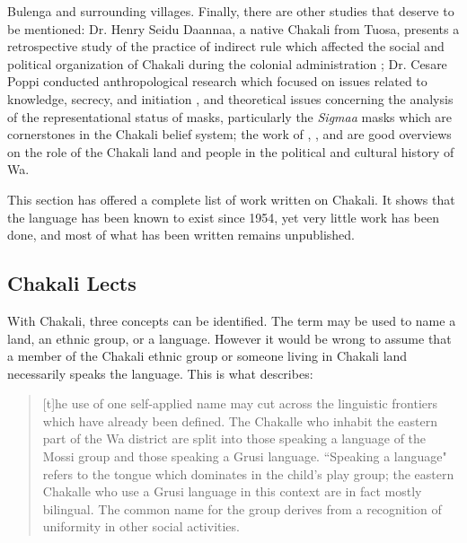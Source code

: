 Bulenga and surrounding villages. 
Finally, there are other studies that deserve to be
mentioned:  Dr. Henry Seidu Daannaa,   a native Chakali from Tuosa,  presents a
retrospective study of the practice of indirect rule  which affected the
social and political organization of  Chakali during the colonial 
administration 
\citep{Daan94};    Dr. Cesare Poppi conducted anthropological research which 
focused on issues related to knowledge, secrecy,  and initiation 
\citep{Popp93}, 
and  theoretical issues concerning the analysis of the representational status 
of masks, particularly the {\it Sigmaa} masks which are cornerstones in the  
Chakali 
belief system; the work of \citet{Doug66},  \citet{Wilk89}, and \citet{Sali08}  
are good  overviews 
on 
the role of the Chakali land and people in the  political and cultural history 
of Wa.

This section has offered a complete list of work written on Chakali. It shows 
that the language has been 
known to exist since 1954, yet very little work has been done,  and  most of 
what 
has been written  remains unpublished.

\subsection{Chakali Lects}
\label{sec:lects}

With Chakali,    three concepts can be
identified. The term may be used  to name a land,  
an ethnic group,   or a language.  
However it would be wrong to assume that a member of the Chakali ethnic group  
or 
 someone living in Chakali land necessarily speaks the language.  This is 
 what \citeauthor{Good54} describes: 

\begin{quote} [t]he use of one self-applied name may cut across the linguistic
frontiers which have already been defined. The Chakalle who inhabit the eastern
part of the Wa district are split into those speaking a language of the Mossi
group and those speaking a Grusi language. ``Speaking a language" 
refers to the
tongue which dominates in the child's play group; the eastern Chakalle who use a
Grusi language in this context are in fact mostly bilingual. The 
common name for
the group derives from a recognition of uniformity in other social activities.
  \citet[2]{Good54}
\end{quote}
 
 

